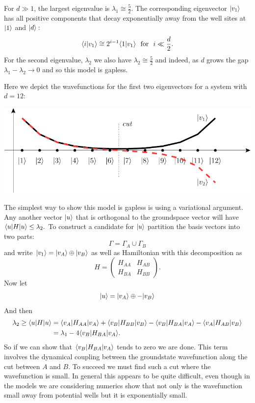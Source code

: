 For $d\gg 1$, the largest
eigenvalue is $\lambda_1 \cong \frac{5}{2}$.
The corresponding eigenvector $|{v_1}\rangle$
has all positive components that
decay exponentially away from the well sites
at $|{1}\rangle$ and $|{d}\rangle:$
$$
    \langle{i}|{v_1}\rangle 
    \cong 2^{i-1} \langle{1}|{v_1}\rangle
    \ \ \mbox{for}\ \ i\ll \frac{d}{2}.
$$
For the second eigenvalue, $\lambda_2$
we also have  $\lambda_2 \cong \frac{5}{2}$
and indeed, as $d$ grows
the gap $\lambda_1 - \lambda_2 \rightarrow 0$
and so this model is gapless.

Here we depict the wavefunctions for
the first two eigenvectors for a system with $d=12:$
\begin{center}
\includegraphics[]{pic-dwell.pdf}
\end{center}
The simplest way to show this model
is gapless is using a variational
argument.
Any another vector $|{u}\rangle$
that is orthogonal to the groundspace
vector will have $\langle{u}|H|{u}\rangle \le \lambda_2.$
To construct a candidate for $|{u}\rangle$
partition the
basis vectors into two parts:
$$
    \Gamma = \Gamma_A \cup \Gamma_B
$$
and write $|{v_1}\rangle = 
|{v_A}\rangle\oplus|{v_B}\rangle$
as well as Hamiltonian with this
decomposition as
$$
H = 
\left(\begin{array}{ll}
H_{AA} & H_{AB} \\
H_{BA} & H_{BB}
\end{array}\right).
$$
Now let
$$
    |{u}\rangle = |{v_A}\rangle \oplus -|{v_B}\rangle
$$
And then
\begin{align*}
    \lambda_2 \ge \langle{u}|H|{u}\rangle &= 
\langle{v_A}|H_{AA}|{v_A}\rangle +
\langle{v_B}|H_{BB}|{v_B}\rangle -
\langle{v_B}|H_{BA}|{v_A}\rangle -
\langle{v_A}|H_{AB}|{v_B}\rangle \\
    &= \lambda_1 - 4 \langle{v_B}|H_{BA}|{v_A}\rangle.
\end{align*}
So if we can show that 
$ \langle{v_B}|H_{BA}|{v_A}\rangle$
tends to zero we are done.
This term involves the 
dynamical coupling between the
groundstate wavefunction along
the cut between $A$ and $B$.
To succeed we must find such a cut where
the wavefunction is small. In general
this appears to be quite difficult,
even though in the models we are considering
numerics show that not only is the
wavefunction small away from potential wells
but it is exponentially small.

